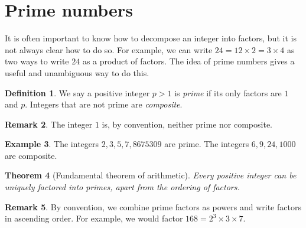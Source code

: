 \documentclass{book}
\theoremstyle{plain}
\newtheorem{theorem}{Theorem}[chapter]
\theoremstyle{definition}
\newtheorem{definition}[theorem]{Definition}
\newtheorem{example}[theorem]{Example}
\newtheorem{remark}[theorem]{Remark}
\begin{document}
\section{Prime numbers}
It is often important to know how to decompose an integer into factors, but it is not always clear how to do so. For example, we can write $24 = 12 \times 2 = 3 \times 4$ as two ways to write $24$ as a product of factors. The idea of prime numbers gives a useful and unambiguous way to do this.

\begin{definition}
We say a positive integer $p > 1$ is {\it prime} if its only factors are $1$ and $p$. Integers that are not prime are {\it composite}.
\end{definition}

\begin{remark}
The integer $1$ is, by convention, neither prime nor composite.
\end{remark}

\begin{example}
The integers $2, 3, 5, 7, 8675309$ are prime. The integers $6, 9, 24, 1000$ are composite.
\end{example}

\begin{theorem}[Fundamental theorem of arithmetic]
Every positive integer can be uniquely factored into primes, apart from the ordering of factors.
\end{theorem}

\begin{remark}
By convention, we combine prime factors as powers and write factors in ascending order. For example, we would factor $168 = 2^3 \times 3 \times 7$.
\end{remark}
\end{document}
